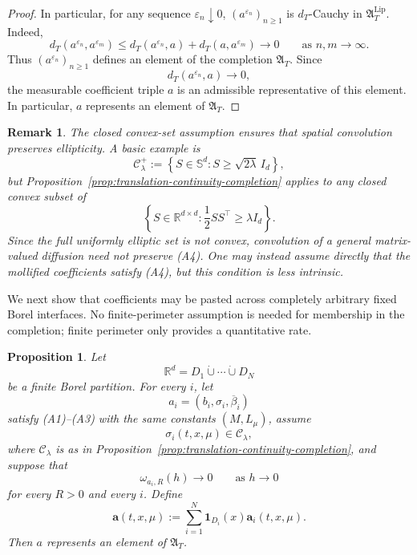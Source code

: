 \documentclass[12pt,oneside, reqno]{amsart}
\newtheorem{remark}[theorem]{Remark}
\newtheorem{proposition}[theorem]{Proposition}
\numberwithin{equation}{section}
\begin{document}
\begin{proof}
	In particular, for any sequence
	\(\varepsilon_n\downarrow0\),
	\((a^{\varepsilon_n})_{n\geq1}\) is \(d_T\)-Cauchy in
	\(\mathfrak A_T^{\mathrm{Lip}}\). Indeed,
	\[
	d_T(a^{\varepsilon_n},a^{\varepsilon_m})
	\leq
	d_T(a^{\varepsilon_n},a)
	+
	d_T(a,a^{\varepsilon_m})
	\longrightarrow0
	\qquad
	\text{as }n,m\to\infty.
	\]
	Thus \((a^{\varepsilon_n})_{n\geq1}\) defines an element of the
	completion \(\mathfrak A_T\). Since
	\[
	d_T(a^{\varepsilon_n},a)
	\longrightarrow0,
	\]
	the measurable coefficient triple \(a\) is an admissible
	representative of this element. In particular,
	\(a\) represents an element of \(\mathfrak A_T\).
\end{proof}
	
\begin{remark}
	\label{rem:nonconvex-general-diffusion}
	The closed convex-set assumption ensures that spatial convolution
	preserves ellipticity. A basic example is
	\[
	\mathcal C_\lambda^+
	:=
	\left\{
	S\in\mathbb S^d:
	S\geq\sqrt{2\lambda}\,I_d
	\right\},
	\]
	but Proposition~\ref{prop:translation-continuity-completion} applies
	to any closed convex subset of
	\[
	\left\{
	S\in\mathbb R^{d\times d}:
	\frac12SS^\top\geq\lambda I_d
	\right\}.
	\]
	Since the full uniformly elliptic set is not convex, convolution of
	a general matrix-valued diffusion need not preserve
	\textnormal{(A4)}. One may instead assume directly that the
	mollified coefficients satisfy \textnormal{(A4)}, but this condition
	is less intrinsic.
\end{remark}
	
	We next show that coefficients may be pasted across completely arbitrary
	fixed Borel interfaces. No finite-perimeter assumption is needed for
	membership in the completion; finite perimeter only provides a quantitative
	rate.
	
	\begin{proposition}
		\label{prop:finite-patching-completion}
		Let
		\[
		\mathbb R^d
		=
		D_1\mathbin{\dot\cup}\cdots\mathbin{\dot\cup}D_N
		\]
		be a finite Borel partition. For every \(i\), let
		\[
		a_i=(b_i,\sigma_i,\overline\beta_i)
		\]
		satisfy \textnormal{(A1)}--\textnormal{(A3)} with the same constants
		\((M,L_\mu)\), assume
		\[
		\sigma_i(t,x,\mu)\in\mathcal C_\lambda,
		\]
		where \(\mathcal C_\lambda\) is as in
		Proposition~\ref{prop:translation-continuity-completion}, and suppose that
		\begin{equation}
			\label{eq:branch-translation-continuity}
			\omega_{a_i,R}(h)\longrightarrow0
			\qquad\text{as }h\longrightarrow0
		\end{equation}
		for every \(R>0\) and every \(i\). Define
		\begin{equation}
			\label{eq:piecewise-lipschitz-coefficient}
			\mathbf a(t,x,\mu)
			:=
			\sum_{i=1}^N
			\mathbf1_{D_i}(x)\mathbf a_i(t,x,\mu).
		\end{equation}
		Then \(a\) represents an element of \(\mathfrak A_T\).
	\end{proposition}
	
\end{document}
